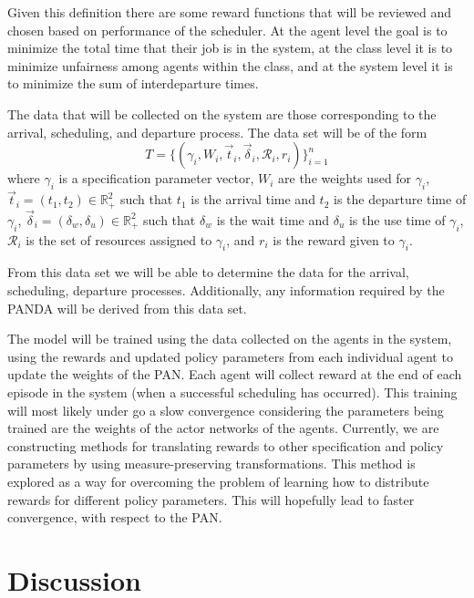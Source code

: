 \documentclass{article}
\theoremstyle{definition}
\theoremstyle{remark}
\begin{document}
		Given this definition there are some reward functions that will be reviewed and chosen based on performance of the scheduler. At the agent level the goal is to minimize the total time that their job is in the system, at the class level it is to minimize unfairness among agents within the class, and at the system level it is to minimize the sum of interdeparture times. 
	
		The data that will be collected on the system are those corresponding to the arrival, scheduling, and departure process. The data set will be of the form
		\[
		T = \{(\gamma_{i}, W_{i},\vec{t}_{i}, \vec{\delta}_{i}, \mathcal{R}_{i}, r_{i})\}_{i = 1}^{n} 
		\]
		where $\gamma_{i}$ is a specification parameter vector, $W_{i}$ are the weights used for $\gamma_{i}$, $\vec{t}_{i} = (t_{1}, t_{2}) \in \mathbb{R}_{+}^{2}$ such that $t_{1}$ is the arrival time and $t_{2}$ is the departure time of $\gamma_{i}$, $\vec{\delta}_{i} = (\delta_{w}, \delta_{u}) \in \mathbb{R}_{+}^{2}$ such that $\delta_{w}$ is the wait time and $\delta_{u}$ is the use time of $\gamma_{i}$, $\mathcal{R}_{i}$ is the set of resources assigned to $\gamma_{i}$, and $r_{i}$ is the reward given to $\gamma_{i}$. 
		
		From this data set we will be able to determine the data for the arrival, scheduling, departure processes. Additionally, any information required by the PANDA will be derived from this data set. 
		
		The model will be trained using the data collected on the agents in the system, using the rewards and updated policy parameters from each individual agent to update the weights of the PAN. Each agent will collect reward at the end of each episode in the system (when a successful scheduling has occurred). This training will most likely under go a slow convergence considering the parameters being trained are the weights of the actor networks of the agents. Currently, we are constructing methods for translating rewards to other specification and policy parameters by using measure-preserving transformations. This method is explored as a way for overcoming the problem of learning how to distribute rewards for different policy parameters. This will hopefully lead to faster convergence, with respect to the PAN.

	\section{Discussion}
	
\end{document}
